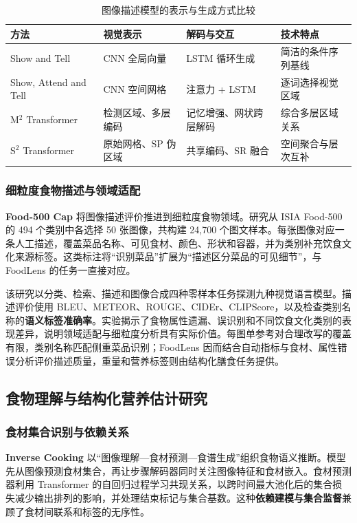 \begin{table}[!htbp]
 \caption{图像描述模型的表示与生成方式比较}
 \label{tab:captioning}
 \centering\small
 \setlength{\tabcolsep}{5pt}\renewcommand{\arraystretch}{1.16}
 \begin{tabularx}{\linewidth}{@{}P{3.0cm}P{3.1cm}P{3.15cm}Y@{}}
 \toprule
 \textbf{方法} & \textbf{视觉表示} & \textbf{解码与交互} & \textbf{技术特点}\\
 \midrule
 Show and Tell & CNN 全局向量 & LSTM 循环生成 & 简洁的条件序列基线\\
 Show, Attend and Tell & CNN 空间网格 & 注意力 + LSTM & 逐词选择视觉区域\\
 M$^2$ Transformer & 检测区域、多层编码 & 记忆增强、网状跨层解码 & 综合多层区域关系\\
 S$^2$ Transformer & 原始网格、SP 伪区域 & 共享编码、SR 融合 & 空间聚合与层次互补\\
 \bottomrule
 \end{tabularx}
\end{table}

\subsubsection{细粒度食物描述与领域适配}
\textbf{Food-500 Cap}\cite{ma2023food} 将图像描述评价推进到细粒度食物领域。研究从 ISIA Food-500 的 494 个类别中各选择 50 张图像，共构建 24,700 个图文样本。每张图像对应一条人工描述，覆盖菜品名称、可见食材、颜色、形状和容器，并为类别补充饮食文化来源标签。这类标注将“识别菜品”扩展为“描述区分菜品的可见细节”，与 FoodLens 的任务一直接对应。

该研究以分类、检索、描述和图像合成四种零样本任务探测九种视觉语言模型。描述评价使用 BLEU、METEOR、ROUGE、CIDEr、CLIPScore，以及检查类别名称的\textbf{语义标签准确率}。实验揭示了食物属性遗漏、误识别和不同饮食文化类别的表现差异，说明领域适配与细粒度分析具有实际价值。每图单参考对合理改写的覆盖有限，类别名称匹配侧重菜品识别；FoodLens 因而结合自动指标与食材、属性错误分析评价描述质量，重量和营养标签则由结构化膳食任务提供。

\FloatBarrier
\subsection{食物理解与结构化营养估计研究}
\label{subsec:nutrition}

\subsubsection{食材集合识别与依赖关系}
\textbf{Inverse Cooking}\cite{salvador2019inverse} 以“图像理解—食材预测—食谱生成”组织食物语义推断。模型先从图像预测食材集合，再让步骤解码器同时关注图像特征和食材嵌入。食材预测器利用 Transformer 的自回归过程学习共现关系，以跨时间最大池化后的集合损失减少输出排列的影响，并处理结束标记与集合基数。这种\textbf{依赖建模与集合监督}兼顾了食材间联系和标签的无序性。

